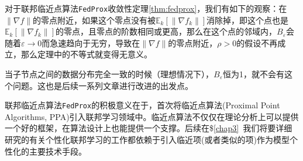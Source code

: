 \begin{rem}
对于联邦临近点算法\texttt{FedProx}收敛性定理\ref{thm:fedprox}，我们有如下的观察：在$\lVert \nabla f \rVert$的零点附近，如果这个零点没有被$\mathbb{E}_k[\lVert \nabla f_k \rVert]$消除掉，即这个点也是$\mathbb{E}_k[\lVert \nabla f_k \rVert]$的零点，且零点的阶数相同或更高，那么在这个点的邻域内，$B_{\varepsilon}$会随着$\varepsilon \to 0$而急速趋向于无穷，导致在$\lVert \nabla f \rVert$的零点附近，$\rho > 0$的假设不再成立，那么定理中的不等式就变得无意义。

当子节点之间的数据分布完全一致的时候（理想情况下），$B_{\varepsilon}$恒为1，就不会有这个问题。这也是后续一系列文章\cite{pathak2020fedsplit,tran2021feddr}进行改进的出发点。
\end{rem}

联邦临近点算法\texttt{FedProx}的积极意义在于，首次将临近点算法(Proximal Point Algorithms, PPA)引入联邦学习领域中。临近点算法不仅仅在理论分析上可以提供一个好的框架，在算法设计上也能提供一个支撑。后续在\$\ref{chap3}~我们将要详细研究的有关个性化联邦学习的工作\cite{hanzely2020federated,li_2021_ditto,t2020pfedme,li2021pfedmac}都依赖于引入临近项(或者类似的项)作为模型个性化的主要技术手段。

